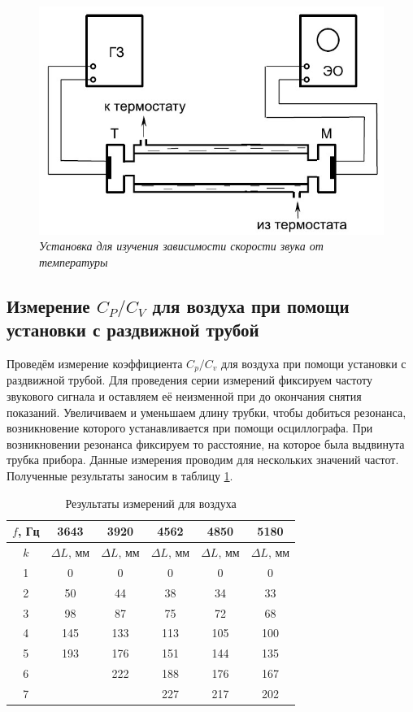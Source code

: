 \documentclass[a4paper,12pt]{article}
\theoremstyle{definition}
\begin{document}
	\begin{figure}[H]
		\begin{center}
			\includegraphics[width=12cm]{ust2.jpg}
		\end{center}
		\caption{\textit{Установка для изучения зависимости скорости звука от температуры}}
		\label{img2}
	\end{figure}
	
	\subsection{Измерение $ C_P/C_V $ для воздуха при помощи установки с раздвижной трубой}
	
	\label{ident}
	
	Проведём измерение коэффициента $ C_p/C_v $ для воздуха при помощи установки с раздвижной трубой. Для проведения серии измерений фиксируем частоту звукового сигнала и оставляем её неизменной при до окончания снятия показаний. Увеличиваем и уменьшаем длину трубки, чтобы добиться резонанса, возникновение которого устанавливается при помощи осциллографа. При возникновении резонанса фиксируем то расстояние, на которое была выдвинута трубка прибора. Данные измерения проводим для нескольких значений частот. Полученные результаты заносим в таблицу \ref{tab:oxy}.
	
	\begin{table}[H]
		\centering
		\begin{tabular}{|c|c|c|c|c|c|}
			\hline
			$ f $, Гц & 3643  &3920  & 4562& 4850& 5180 \\ \hline
			$ k $ &  $ \Delta L $, мм & $\Delta L $, мм &$\Delta L $, мм & $\Delta L $, мм &  $\Delta L $, мм \\ \hline
			1&0&0&0&0&0\\ \hline
			2&50&44&38&34&33\\\hline
			3&98&87&75&72&68\\\hline
			4&145&133&113&105&100\\\hline
			5&193&176&151&144&135\\\hline
			6&&222&188&176&167\\\hline
			7&&&227&217&202\\\hline
			
		\end{tabular}
		\caption{Результаты измерений для воздуха}
		\label{tab:oxy}
	\end{table}
	
\end{document}
